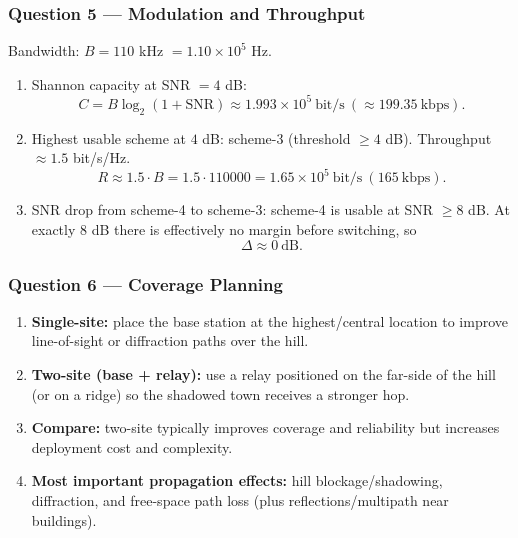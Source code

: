 \documentclass[11pt,a4paper]{article}
\begin{document}
\subsubsection*{Question 5 --- Modulation and Throughput}
Bandwidth: $B=110$ kHz $=1.10\times 10^5$ Hz.

\begin{enumerate}[label=\alph*.]
    \item Shannon capacity at SNR $=4$ dB:
    \[
    C=B\log_2(1+\mathrm{SNR})\approx 1.993\times 10^5\ \text{bit/s}\ (\approx 199.35\ \text{kbps}).
    \]
    \item Highest usable scheme at $4$ dB: scheme-3 (threshold $\ge 4$ dB). Throughput $\approx 1.5$ bit/s/Hz.
    \[
    R\approx 1.5\cdot B=1.5\cdot 110000=1.65\times 10^5\ \text{bit/s}\ (165\ \text{kbps}).
    \]
    \item SNR drop from scheme-4 to scheme-3:
    scheme-4 is usable at SNR $\ge 8$ dB. At exactly $8$ dB there is effectively no margin before switching, so
    \[
    \Delta \approx 0\ \text{dB}.
    \]
\end{enumerate}

\subsubsection*{Question 6 --- Coverage Planning}
\begin{enumerate}[label=\alph*.]
    \item \textbf{Single-site:} place the base station at the highest/central location to improve line-of-sight or diffraction paths over the hill.
    \item \textbf{Two-site (base + relay):} use a relay positioned on the far-side of the hill (or on a ridge) so the shadowed town receives a stronger hop.
    \item \textbf{Compare:} two-site typically improves coverage and reliability but increases deployment cost and complexity.
    \item \textbf{Most important propagation effects:} hill blockage/shadowing, diffraction, and free-space path loss (plus reflections/multipath near buildings).
\end{enumerate}
\end{document}
